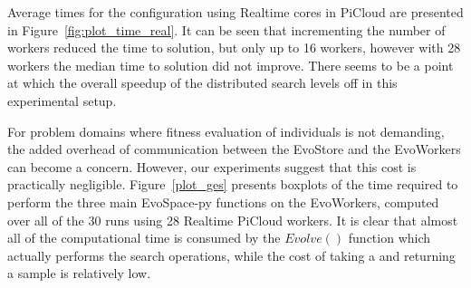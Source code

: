 Average times for the configuration using Realtime cores in PiCloud
are presented in Figure~\ref{fig:plot_time_real}. It can be seen that
incrementing the number of workers reduced the time to solution, but only up to 16 workers,
however with 28 workers the median time to solution did not improve.
There seems to be a point at which the overall speedup of the distributed search levels off in this experimental setup.

For problem domains where fitness evaluation of individuals is not demanding, the added overhead of communication between the EvoStore and the EvoWorkers
can become a concern.
However, our experiments suggest that this cost is practically negligible.
Figure~\ref{plot_ges} presents boxplots of the time required to perform the
three main EvoSpace-py functions on the EvoWorkers, computed over all of the 30 runs using 28 Realtime PiCloud workers.
It is clear that almost all of the computational time is consumed by the $Evolve()$ function which actually performs the search operations,
while the cost of taking a and returning a sample is relatively low.


